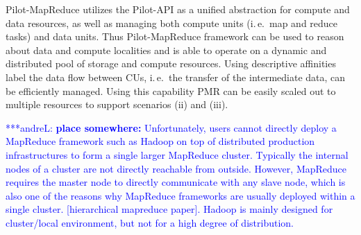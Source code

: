 \documentclass{acm_proc_article-sp}
\newcommand{\alnote}[1]{ {\textcolor{blue} { ***andreL: #1 }}}
\newcommand{\alnote}[1]{}
\newcommand{\upp}{\vspace*{-0.5em}}
\newcommand{\pilotmapreduce}{Pilot-MapReduce\xspace}
\begin{document}
\pilotmapreduce utilizes the Pilot-API as a unified abstraction for
compute and data resources, as well as managing both compute units
(i.\,e.\ map and reduce tasks) and data units.  Thus \pilotmapreduce
framework can be used to reason about data and compute localities and
is able to operate on a dynamic and distributed pool of storage and
compute resources.  Using descriptive affinities label the data flow
between CUs, i.\,e.\ the transfer of the intermediate data, can be
efficiently managed. Using this capability PMR can be easily scaled
out to multiple resources to support scenarios (ii) and (iii).



\alnote{\textbf{place somewhere:} Unfortunately, users cannot directly
  deploy a MapReduce framework such as Hadoop on top of distributed
  production infrastructures to form a single larger MapReduce
  cluster. Typically the internal nodes of a cluster are not directly
  reachable from outside. However, MapReduce requires the master node
  to directly communicate with any slave node, which is also one of
  the reasons why MapReduce frameworks are usually deployed within a
  single cluster. [hierarchical mapreduce paper]. Hadoop is mainly
  designed for cluster/local environment, but not for a high degree of
  distribution.}



\upp
\end{document}
